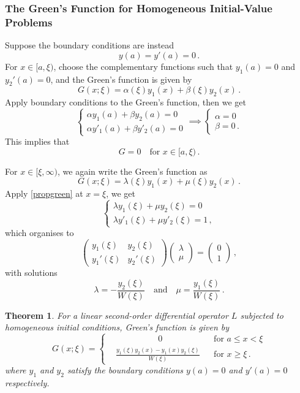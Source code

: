 \documentclass{article}
\theoremstyle{plain}\theoremheaderfont{\normalfont\itshape}\theorembodyfont{\rmfamily}\theoremseparator{.}\newtheorem*{rem}{Remark}\newtheorem*{ex}{Example}\newtheorem*{proof}{Proof}\newtheorem*{altp}{Alternative proof}
\theoremstyle{plain}\theoremheaderfont{\normalfont\bfseries}\theorembodyfont{\rmfamily}\theoremseparator{.}\newtheorem{thm}{Theorem}[section]\newtheorem{lem}[thm]{Lemma}\newtheorem{prop}[thm]{Proposition}\newtheorem*{cor}{Corollary}\newtheorem{defn}[thm]{Definition}\newtheorem{clm}[thm]{Claim}\newtheorem{clminproof}{Claim}
\theoremstyle{break}\theoremheaderfont{\normalfont\itshape}\theorembodyfont{\rmfamily}\theoremseparator{.\medskip}\newtheorem*{proofskip}{Proof}\newtheorem*{exs}{Examples}\newtheorem*{rems}{Remarks}
\theoremstyle{break}\theoremheaderfont{\normalfont\bfseries}\theorembodyfont{\rmfamily}\theoremseparator{.\medskip}\newtheorem{lemskip}[thm]{Lemma}\newtheorem{defnskip}[thm]{Definition}\newtheorem{propskip}[thm]{Proposition}\newtheorem{thmskip}[thm]{Theorem}
\numberwithin{equation}{section}
\begin{document}
	\subsubsection{The Green's Function for Homogeneous Initial-Value Problems}
	Suppose the boundary conditions are instead
	\[y(a)=y'(a)=0\,.\]
	For \(x\in[a,\xi)\), choose the complementary functions such that \(y_1(a)=0\) and \(y_2'(a)=0\), and the Green's function is given by
	\[G(x;\xi)=\alpha(\xi)y_1(x)+\beta(\xi)y_2(x)\,.\]
	Apply boundary conditions to the Green's function, then we get
	\[\begin{cases}
		\alpha y_1(a)+\beta y_2(a)=0\\
		\alpha y'_1(a)+\beta y'_2(a)=0
	\end{cases}\implies\begin{cases}
		\alpha=0\\
		\beta=0\,.
	\end{cases}\]
	This implies that
	\[G=0\quad\text{for }x\in[a,\xi)\,.\]

	For \(x\in[\xi,\infty)\), we again write the Green's function as
	\[G(x;\xi)=\lambda(\xi)y_1(x)+\mu(\xi)y_2(x)\,.\]
	Apply \cref{propgreen} at \(x=\xi\), we get
	\[\begin{cases}
		\lambda y_1(\xi)+\mu y_2(\xi)=0\\
		\lambda y'_1(\xi)+\mu y'_2(\xi)=1\,,
	\end{cases}\]
	which organises to
	\[\begin{pmatrix}
		y_1(\xi) & y_2(\xi)\\
		y_1'(\xi) & y_2'(\xi)
	\end{pmatrix}\begin{pmatrix}
		\lambda\\
		\mu
	\end{pmatrix}=\begin{pmatrix}
		0\\
		1
	\end{pmatrix}\,,\]
	with solutions
	\[\lambda=-\frac{y_2(\xi)}{W(\xi)}\quad \text{and} \quad \mu=\frac{y_1(\xi)}{W(\xi)}\,.\]
	
	\begin{thm}
		For a linear second-order differential operator \(L\) subjected to homogeneous initial conditions, Green's function is given by
		\[G(x;\xi)=\left\{\begin{aligned}
			& \qquad\qquad\,\,\,\,\;0 && \text{for }a\le x<\xi\\
			&\frac{y_1(\xi)y_2(x)-y_1(x)y_2(\xi)}{W(\xi)} && \text{for }x\ge\xi\,.
		\end{aligned}\right.\]
		where \(y_1\) and \(y_2\) satisfy the boundary conditions \(y(a)=0\) and \(y'(a)=0\) respectively.
	\end{thm}
	
\end{document}
